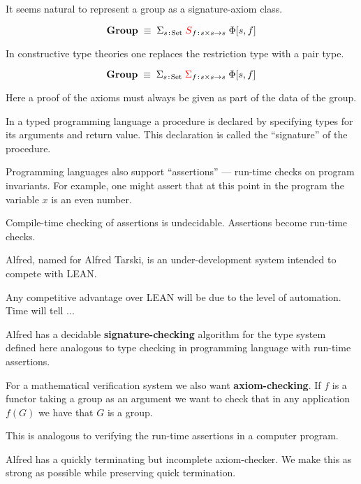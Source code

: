 {

It seems natural to represent a group as a signature-axiom class.

$$\mathbf{Group} \; \equiv \; \Sigma_{s\;\!:\!\;\mathrm{Set}}\;{\color{red} S}_{f\;\!:\!\; s\times s \rightarrow s}\;\Phi[s,f]$$

\vfill
In constructive type theories one replaces the restriction type
with a pair type.

$$\mathbf{Group} \; \equiv \; \Sigma_{s\;\!:\!\;\mathrm{Set}}\;{\color{red} \Sigma}_{f\;\!:\!\; s\times s \rightarrow s}\;\Phi[s,f]$$

\vfill
Here a proof of the axioms must always be given as part of the data of the group.



\vfill
In a typed programming language a procedure is declared by specifying types for its arguments and return value.  This declaration is called the ``signature'' of the procedure.

\vfill
Programming languages also support ``assertions'' --- run-time checks on program invariants.  For example, one might assert that at this point
in the program the variable $x$ is an even number.

\vfill
Compile-time checking of assertions is undecidable. Assertions become run-time checks.



Alfred, named for Alfred Tarski, is an under-development system intended to compete with LEAN.

\vfill
Any competitive advantage over LEAN will be due to the level of automation.  Time will tell ...



Alfred has a decidable {\bf signature-checking} algorithm for the type system defined here analogous
to type checking in programming language with run-time assertions.

\vfill
For a mathematical verification system we also want {\bf axiom-checking}. If $f$ is a functor taking a group as an argument
we want to check that in any application $f(G)$ we have that $G$ is a group.

\vfill
This is analogous to verifying the run-time assertions in a computer program.


Alfred has a quickly terminating but incomplete axiom-checker.  We make this as strong as possible while preserving quick termination.

}
